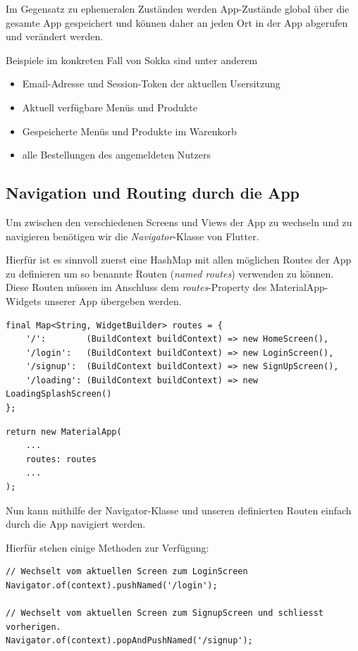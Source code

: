 Im Gegensatz zu ephemeralen Zuständen werden App-Zustände global über die gesamte App gespeichert und
können daher an jeden Ort in der App abgerufen und verändert werden.

Beispiele im konkreten Fall von Sokka sind unter anderem
\begin{itemize}
    \item Email-Adresse und Session-Token der aktuellen Usersitzung
    \item Aktuell verfügbare Menüs und Produkte
    \item Gespeicherte Menüs und Produkte im Warenkorb
    \item alle Bestellungen des angemeldeten Nutzers
\end{itemize}

\subsection{Navigation und Routing durch die App}

Um zwischen den verschiedenen Screens und Views der App zu wechseln und zu navigieren 
benötigen wir die \textit{Navigator}-Klasse von Flutter.

Hierfür ist es sinnvoll zuerst eine HashMap mit allen möglichen Routes der App zu definieren
um so benannte Routen (\textit{named routes}) verwenden zu können.\\
Diese Routen müssen im Anschluss dem \textit{routes}-Property des MaterialApp-Widgets unserer App übergeben werden.

\begin{lstlisting}
final Map<String, WidgetBuilder> routes = {
    '/':        (BuildContext buildContext) => new HomeScreen(),
    '/login':   (BuildContext buildContext) => new LoginScreen(),
    '/signup':  (BuildContext buildContext) => new SignUpScreen(),
    '/loading': (BuildContext buildContext) => new LoadingSplashScreen()
};
\end{lstlisting}

\begin{lstlisting}
return new MaterialApp( 
    ...
    routes: routes
    ...
);
\end{lstlisting}

Nun kann mithilfe der Navigator-Klasse und unseren definierten Routen einfach durch die App
navigiert werden.

Hierfür stehen einige Methoden zur Verfügung:

\begin{lstlisting}
// Wechselt vom aktuellen Screen zum LoginScreen
Navigator.of(context).pushNamed('/login');

// Wechselt vom aktuellen Screen zum SignupScreen und schliesst vorherigen.
Navigator.of(context).popAndPushNamed('/signup');
\end{lstlisting}

